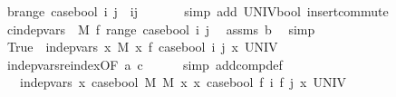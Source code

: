 \begin{isabellebody}
\ b{\isacharcolon}{\kern0pt}{\isachardoublequoteopen}range\ {\isacharparenleft}{\kern0pt}case{\isacharunderscore}{\kern0pt}bool\ i\ j{\isacharparenright}{\kern0pt}\ {\isacharequal}{\kern0pt}\ {\isacharbraceleft}{\kern0pt}i{\isacharcomma}{\kern0pt}j{\isacharbraceright}{\kern0pt}{\isachardoublequoteclose}\ \isanewline
\ \ \ \ \isamarkupfalse%
\ {\isacharparenleft}{\kern0pt}simp\ add{\isacharcolon}{\kern0pt}\ UNIV{\isacharunderscore}{\kern0pt}bool\ insert{\isacharunderscore}{\kern0pt}commute{\isacharparenright}{\kern0pt}\isanewline
\ \ \isamarkupfalse%
\ c{\isacharcolon}{\kern0pt}{\isachardoublequoteopen}indep{\isacharunderscore}{\kern0pt}vars\ {\isacharparenleft}{\kern0pt}{\isasymlambda}{\isacharunderscore}{\kern0pt}{\isachardot}{\kern0pt}\ M{\isacharprime}{\kern0pt}{\isacharparenright}{\kern0pt}\ f\ {\isacharparenleft}{\kern0pt}range\ {\isacharparenleft}{\kern0pt}case{\isacharunderscore}{\kern0pt}bool\ i\ j{\isacharparenright}{\kern0pt}{\isacharparenright}{\kern0pt}{\isachardoublequoteclose}\ \isamarkupfalse%
\ assms{\isacharparenleft}{\kern0pt}{}{\isacharparenright}{\kern0pt}\ b\ \isamarkupfalse%
\ simp\isanewline
\isanewline
\ \ \isamarkupfalse%
\ {\isachardoublequoteopen}True\ {\isacharequal}{\kern0pt}\ indep{\isacharunderscore}{\kern0pt}vars\ {\isacharparenleft}{\kern0pt}{\isasymlambda}x{\isachardot}{\kern0pt}\ M{\isacharprime}{\kern0pt}{\isacharparenright}{\kern0pt}\ {\isacharparenleft}{\kern0pt}{\isasymlambda}x{\isachardot}{\kern0pt}\ f\ {\isacharparenleft}{\kern0pt}case{\isacharunderscore}{\kern0pt}bool\ i\ j\ x{\isacharparenright}{\kern0pt}{\isacharparenright}{\kern0pt}\ UNIV{\isachardoublequoteclose}\ \isanewline
\ \ \ \ \isamarkupfalse%
\ indep{\isacharunderscore}{\kern0pt}vars{\isacharunderscore}{\kern0pt}reindex{\isacharbrackleft}{\kern0pt}OF\ a\ c{\isacharbrackright}{\kern0pt}\isanewline
\ \ \ \ \isamarkupfalse%
\ {\isacharparenleft}{\kern0pt}simp\ add{\isacharcolon}{\kern0pt}comp{\isacharunderscore}{\kern0pt}def{\isacharparenright}{\kern0pt}\isanewline
\ \ \isamarkupfalse%
\ \isamarkupfalse%
\ {\isachardoublequoteopen}{\isachardot}{\kern0pt}{\isachardot}{\kern0pt}{\isachardot}{\kern0pt}\ {\isacharequal}{\kern0pt}\ indep{\isacharunderscore}{\kern0pt}vars\ {\isacharparenleft}{\kern0pt}{\isasymlambda}x{\isachardot}{\kern0pt}\ case{\isacharunderscore}{\kern0pt}bool\ M{\isacharprime}{\kern0pt}\ M{\isacharprime}{\kern0pt}\ x{\isacharparenright}{\kern0pt}\ {\isacharparenleft}{\kern0pt}{\isasymlambda}x{\isachardot}{\kern0pt}\ case{\isacharunderscore}{\kern0pt}bool\ {\isacharparenleft}{\kern0pt}f\ i{\isacharparenright}{\kern0pt}\ {\isacharparenleft}{\kern0pt}f\ j{\isacharparenright}{\kern0pt}\ x{\isacharparenright}{\kern0pt}\ UNIV{\isachardoublequoteclose}\isanewline

\end{isabellebody}
